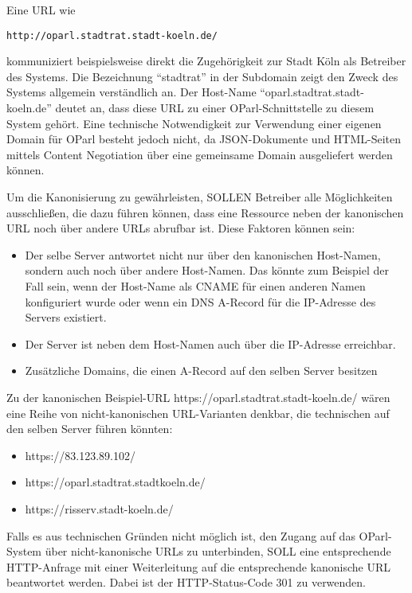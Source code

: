 \documentclass[,a4paper]{article}
\begin{document}
Eine URL wie

\begin{verbatim}
http://oparl.stadtrat.stadt-koeln.de/
\end{verbatim}

kommuniziert beispielsweise direkt die Zugehörigkeit zur Stadt Köln als
Betreiber des Systems. Die Bezeichnung ``stadtrat'' in der Subdomain
zeigt den Zweck des Systems allgemein verständlich an. Der Host-Name
``oparl.stadtrat.stadt-koeln.de'' deutet an, dass diese URL zu einer
OParl-Schnittstelle zu diesem System gehört. Eine technische
Notwendigkeit zur Verwendung einer eigenen Domain für OParl besteht
jedoch nicht, da JSON-Dokumente und HTML-Seiten mittels Content
Negotiation über eine gemeinsame Domain ausgeliefert werden können.

Um die Kanonisierung zu gewährleisten, SOLLEN Betreiber alle
Möglichkeiten ausschließen, die dazu führen können, dass eine Ressource
neben der kanonischen URL noch über andere URLs abrufbar ist. Diese
Faktoren können sein:

\begin{itemize}
\item
  Der selbe Server antwortet nicht nur über den kanonischen Host-Namen,
  sondern auch noch über andere Host-Namen. Das könnte zum Beispiel der
  Fall sein, wenn der Host-Name als CNAME für einen anderen Namen
  konfiguriert wurde oder wenn ein DNS A-Record für die IP-Adresse des
  Servers existiert.
\item
  Der Server ist neben dem Host-Namen auch über die IP-Adresse
  erreichbar.
\item
  Zusätzliche Domains, die einen A-Record auf den selben Server besitzen
\end{itemize}

Zu der kanonischen Beispiel-URL https://oparl.stadtrat.stadt-koeln.de/
wären eine Reihe von nicht-kanonischen URL-Varianten denkbar, die
technischen auf den selben Server führen könnten:

\begin{itemize}
\itemsep1pt\parskip0pt
\item
  https://83.123.89.102/
\item
  https://oparl.stadtrat.stadtkoeln.de/
\item
  https://risserv.stadt-koeln.de/
\end{itemize}

Falls es aus technischen Gründen nicht möglich ist, den Zugang auf das
OParl-System über nicht-kanonische URLs zu unterbinden, SOLL eine
entsprechende HTTP-Anfrage mit einer Weiterleitung auf die entsprechende
kanonische URL beantwortet werden. Dabei ist der HTTP-Status-Code 301 zu
verwenden.
\end{document}

